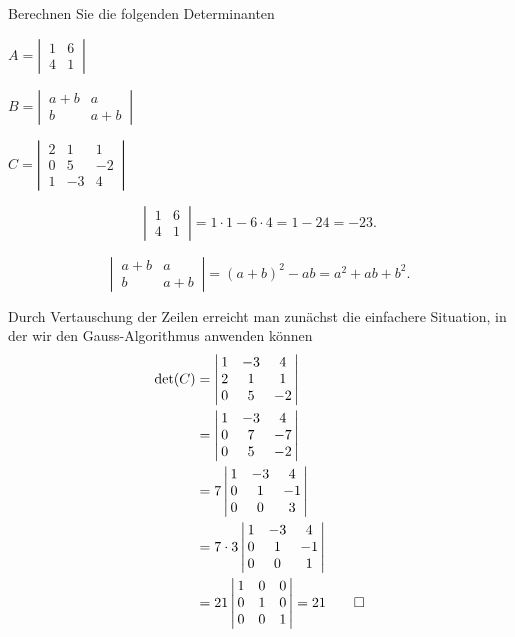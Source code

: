 Berechnen Sie die folgenden Determinanten
\begin{teilaufgaben}
\item $A=\left|\,\begin{matrix}1&6\\4&1\end{matrix}\,\right|$
\item $B=\left|\,\begin{matrix}a+b&a\\b&a+b\end{matrix}\,\right|$
\item $C=\left|\,\begin{matrix}2&1&1\\0&5&-2\\1&-3&4\end{matrix}\,\right|$
\end{teilaufgaben}

\begin{loesung}
\begin{teilaufgaben}
\item
\[
\left|\,\begin{matrix}1&6\\4&1\end{matrix}\,\right|=1\cdot 1-6\cdot 4=1-24=-23.
\]
\item
\[
\left|\,\begin{matrix}a+b&a\\b&a+b\end{matrix}\,\right|=(a+b)^2 -ab=a^2+ab+b^2.
\]
\item Durch Vertauschung der Zeilen erreicht man zunächst die einfachere
Situation, in der wir den Gauss-Algorithmus anwenden können
\begin{align*}
\det(C)&=
\left|\,\begin{matrix}
1&-3&4\\
2&1&1\\
0&5&-2
\end{matrix}\,\right|
\\
&=
\left|\,\begin{matrix}
1&-3&4\\
0&7&-7\\
0&5&-2
\end{matrix}\,\right|
\\
&=
7\left|\,\begin{matrix}
1&-3&4\\
0&1&-1\\
0&0&3
\end{matrix}\,\right|
\\
&=
7\cdot 3
\left|\,\begin{matrix}
1&-3&4\\
0&1&-1\\
0&0&1
\end{matrix}\,\right|
\\
&=21
\left|\,\begin{matrix}
1&0&0\\
0&1&0\\
0&0&1
\end{matrix}\,\right|=21
\qedhere
\end{align*}
\end{teilaufgaben}
\end{loesung}
